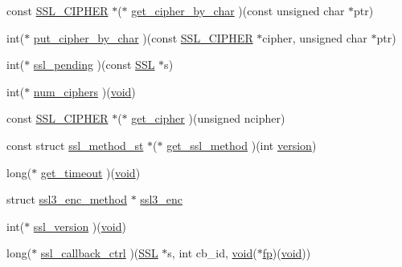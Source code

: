 \begin{DoxyCompactItemize}
\item 
const \hyperlink{include_2openssl_2ssl_8h_a548d7a5d565a9e0e9bd45c49f8c95701}{S\+S\+L\+\_\+\+C\+I\+P\+H\+ER} $\ast$($\ast$ \hyperlink{structssl__method__st_a5ee9e79cd101a7db7c5e488f265c9434}{get\+\_\+cipher\+\_\+by\+\_\+char} )(const unsigned char $\ast$ptr)
\item 
int($\ast$ \hyperlink{structssl__method__st_a16cef3ae5be3b497ea2191a776c02a81}{put\+\_\+cipher\+\_\+by\+\_\+char} )(const \hyperlink{include_2openssl_2ssl_8h_a548d7a5d565a9e0e9bd45c49f8c95701}{S\+S\+L\+\_\+\+C\+I\+P\+H\+ER} $\ast$cipher, unsigned char $\ast$ptr)
\item 
int($\ast$ \hyperlink{structssl__method__st_ae027b68f80240fd6911ac45c680780cc}{ssl\+\_\+pending} )(const \hyperlink{crypto_2ossl__typ_8h_a71f21e09bf365489dab9d85bd4785e24}{S\+SL} $\ast$s)
\item 
int($\ast$ \hyperlink{structssl__method__st_a4840f98f78abb79a165f15dd9acc9fdc}{num\+\_\+ciphers} )(\hyperlink{hw__4758__cca_8h_afad4d591c7931ff6dc5bf69c76c96aa0}{void})
\item 
const \hyperlink{include_2openssl_2ssl_8h_a548d7a5d565a9e0e9bd45c49f8c95701}{S\+S\+L\+\_\+\+C\+I\+P\+H\+ER} $\ast$($\ast$ \hyperlink{structssl__method__st_a26c139f7abb7927211228996a991da65}{get\+\_\+cipher} )(unsigned ncipher)
\item 
const struct \hyperlink{structssl__method__st}{ssl\+\_\+method\+\_\+st} $\ast$($\ast$ \hyperlink{structssl__method__st_a766301158a82ffced42d9924e2af0add}{get\+\_\+ssl\+\_\+method} )(int \hyperlink{structssl__method__st_aad880fc4455c253781e8968f2239d56f}{version})
\item 
long($\ast$ \hyperlink{structssl__method__st_afb81e3edea06be40880c3bf5f3215c15}{get\+\_\+timeout} )(\hyperlink{hw__4758__cca_8h_afad4d591c7931ff6dc5bf69c76c96aa0}{void})
\item 
struct \hyperlink{structssl3__enc__method}{ssl3\+\_\+enc\+\_\+method} $\ast$ \hyperlink{structssl__method__st_ae9492757693f162417b608540295b66c}{ssl3\+\_\+enc}
\item 
int($\ast$ \hyperlink{structssl__method__st_ac1006c82a4a9ab66dd41a14ab6672d87}{ssl\+\_\+version} )(\hyperlink{hw__4758__cca_8h_afad4d591c7931ff6dc5bf69c76c96aa0}{void})
\item 
long($\ast$ \hyperlink{structssl__method__st_aa24a0c83d83ae1af7dcf9af476b22927}{ssl\+\_\+callback\+\_\+ctrl} )(\hyperlink{crypto_2ossl__typ_8h_a71f21e09bf365489dab9d85bd4785e24}{S\+SL} $\ast$s, int cb\+\_\+id, \hyperlink{hw__4758__cca_8h_afad4d591c7931ff6dc5bf69c76c96aa0}{void}($\ast$\hyperlink{include_2openssl_2conf_8h_aa065f30aa9f5f9a42132c82c787ee70b}{fp})(\hyperlink{hw__4758__cca_8h_afad4d591c7931ff6dc5bf69c76c96aa0}{void}))

\end{DoxyCompactItemize}

